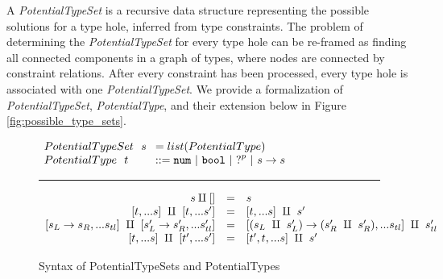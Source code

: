 A \textit{PotentialTypeSet} is a recursive data structure representing the possible solutions for a type hole, inferred from type constraints. The problem of determining the \textit{PotentialTypeSet} for every type hole can be re-framed as finding all connected components in a graph of types, where nodes are connected by constraint relations. After every constraint has been processed, every type hole is associated with one \textit{PotentialTypeSet}. We provide a formalization of \textit{PotentialTypeSet}, \textit{PotentialType}, and their extension below in Figure \ref{fig:possible_type_sets}.

\begin{figure}[h!]
\centering
\vspace{-3px} 
$\arraycolsep=4pt\begin{array}{lll}
PotentialTypeSet~~ s & = list(PotentialType)
\\
PotentialType~~ t & ::= 
  \tnum ~\vert~
  \tbool ~\vert~
  \tehole^p ~\vert~
  \tarr{s}{s}
  \\
\end{array}$
\label{fig:syntax_possible_type_sets}
\caption{Syntax of PotentialTypeSets and PotentialTypes}
\vspace{5px}
\hrule
\[\begin{array}{rcl}
    s \amalg [] & = & s \\
    \left[t,...s\right] ~\amalg~ \left[t,...s'\right] & = & \left[t,...s\right] ~\amalg~ s' \\
    \left[s_L \rightarrow s_R,...s_{tl}\right] ~\amalg~ \left[s'_L \rightarrow s'_R,...s'_{tl}\right] & = & \left[(s_L ~\amalg~ s'_L) \rightarrow (s'_R ~\amalg~ s'_R),...s_{tl}\right] ~\amalg~ s'_{tl} \\
    \left[t,...s\right] ~\amalg~ \left[t',...s'\right] & = & \left[t',t,...s\right] ~\amalg~ s' \\
    

\end{array}\]
\end{figure}
